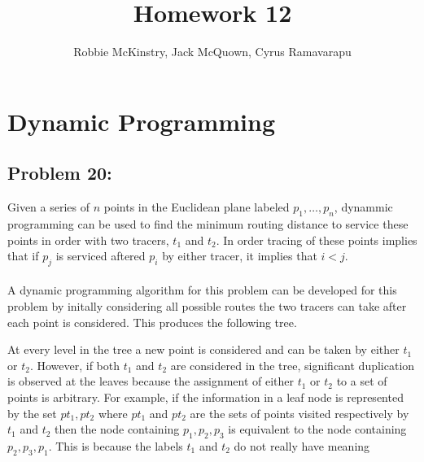 \documentclass[12pt]{article}
\begin{document}
\title{Homework 12}
\author{Robbie McKinstry, Jack McQuown, Cyrus Ramavarapu}
\renewcommand{\today}{30 September 2016}
\renewcommand{\baselinestretch}{1.5}
\maketitle

\section*{Dynamic Programming}
\subsection*{Problem 20: }
Given a series of $n$ points in the Euclidean plane labeled
$p_1,\dots,p_n$, dynammic programming can be used to find the 
minimum routing distance to service these points in order
with two tracers, $t_1$ and $t_2$.  In order tracing of these points
implies that if $p_j$ is serviced aftered $p_i$ by either tracer, it 
implies that $i<j$.\\\\
A dynamic programming algorithm for this problem can be
developed for this problem by initally considering all possible
routes the two tracers can take after each point is considered. 
This produces the following tree.
\begin{center}
\end{center} 
At every level in the tree a new point is considered and can be
taken by either $t_1$ or $t_2$.  However, if both $t_1$ and $t_2$
are considered in the tree, significant duplication is observed
at the leaves because the assignment of either $t_1$ or $t_2$ to
a set of points is arbitrary.  For example, if the information
in a leaf node is represented by the set ${pt_1,pt_2}$ where 
$pt_1$ and $pt_2$ are the sets of points visited respectively
by $t_1$ and $t_2$ then the node containing ${{p_1},{p_2,p_3}}$
is equivalent to the node containing ${{p_2,p_3},{p_1}}$.  This
is because the labels $t_1$ and $t_2$ do not really have meaning
\end{document}
